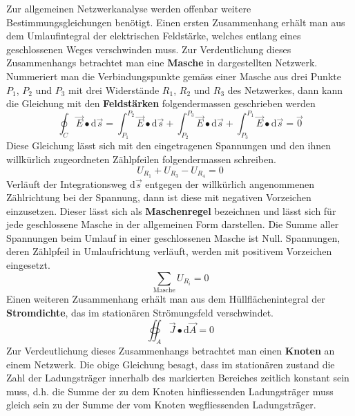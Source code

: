 \noindent Zur allgemeinen Netzwerkanalyse werden offenbar weitere Bestimmungsgleichungen benötigt. Einen ersten Zusammenhang erhält man aus dem Umlaufintegral der elektrischen Feldstärke, welches entlang eines geschlossenen Weges verschwinden muss. Zur Verdeutlichung dieses Zusammenhangs betrachtet man eine \textbf{Masche} in dargestellten Netzwerk.
\newline\newline
Nummeriert man die Verbindungspunkte gemäss einer Masche aus drei Punkte $P_1$, $P_2$ und $P_3$ mit drei Widerstände $R_1$, $R_2$ und $R_3$ des Netzwerkes, dann kann die Gleichung mit den \textbf{Feldstärken} folgendermassen geschrieben werden
\begin{equation}
\boxed{\displaystyle \oint_{C}\overrightarrow{E}\bullet \text{d}\overrightarrow{s}=\displaystyle \int_{P_1}^{P_2}\overrightarrow{E}\bullet \text{d}\overrightarrow{s}+\displaystyle \int_{P_2}^{P_3}\overrightarrow{E}\bullet \text{d}\overrightarrow{s}+\displaystyle \int_{P_3}^{P_1}\overrightarrow{E}\bullet \text{d}\overrightarrow{s}=\overrightarrow{0}}
\end{equation}
Diese Gleichung lässt sich mit den eingetragenen Spannungen und den ihnen willkürlich zugeordneten Zählpfeilen folgendermassen schreiben. 
\begin{equation}
\boxed{U_{R_1}+U_{R_3}-U_{R_4}=0}
\end{equation}
Verläuft der Integrationsweg $\text{d}\overrightarrow{s}$ entgegen der willkürlich angenommenen Zählrichtung bei der Spannung, dann ist diese mit negativen Vorzeichen einzusetzen. Dieser lässt sich als \textbf{Maschenregel} bezeichnen und lässt sich für jede geschlossene Masche in der allgemeinen Form darstellen. Die Summe aller Spannungen beim Umlauf in einer geschlossenen Masche ist Null. Spannungen, deren Zählpfeil in Umlaufrichtung verläuft, werden mit positivem Vorzeichen eingesetzt. 
\begin{equation}
\boxed{\displaystyle \sum_{\text{Masche}} U_{R_i}=0}
\end{equation}
Einen weiteren Zusammenhang erhält man aus dem Hüllflächenintegral der \textbf{Stromdichte}, das im stationären Strömungsfeld verschwindet.
\begin{equation}
\boxed{\displaystyle \oiint_{A}\overrightarrow{J}\bullet \text{d}\overrightarrow{A}=0}
\end{equation}
Zur Verdeutlichung dieses Zusammenhangs betrachtet man einen \textbf{Knoten} an einem Netzwerk. Die obige Gleichung besagt, dass im stationären zustand die Zahl der Ladungsträger innerhalb des markierten Bereiches zeitlich konstant sein muss, d.h. die Summe der zu dem Knoten hinfliessenden Ladungsträger muss gleich sein zu der Summe der vom Knoten wegfliessenden Ladungsträger.
